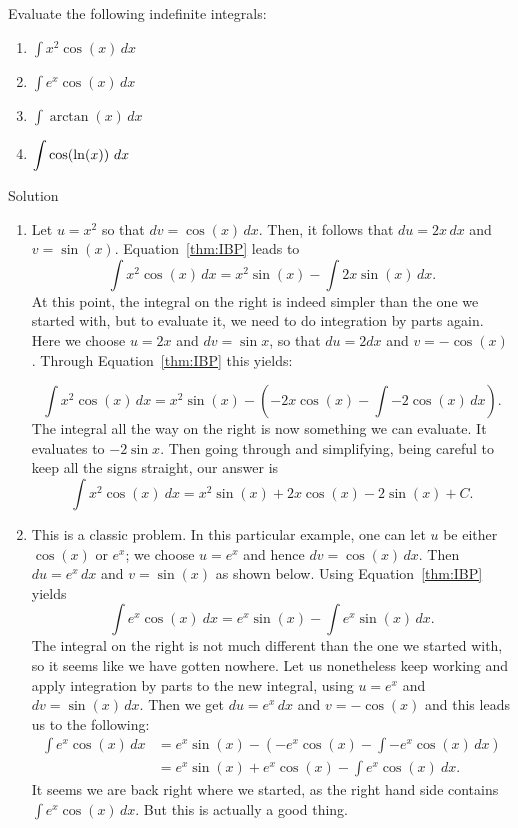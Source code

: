 \begin{example}
Evaluate the following indefinite integrals:
\begin{multicols}{2}
\begin{enumerate}
\item $\displaystyle \int x^2\cos(x) \,dx$
\item  $\displaystyle \int e^x\cos(x) \,dx$
\item $\displaystyle \int \arctan(x)  \,dx$
\item $\ds \int \cos(\ln(x))\ dx$
\end{enumerate}
\end{multicols}

\pagebreak
{}Solution 

\begin{enumerate}
\item  Let $u=x^2$ so that $dv=\cos(x)\,dx$.  Then, it follows that $du=2x\,dx$ and $v=\sin(x)$. Equation~\eqref{thm:IBP} leads to 
$$\int x^2\cos(x)\,dx = x^2\sin(x) - \int 2x\sin(x)\,dx.$$
At this point, the integral on the right is indeed simpler than the one we started with, but to evaluate it, we need to do integration by parts again. Here we choose $u=2x$ and $dv=\sin x$, so that $du=2dx$ and $v=-\cos(x)$. Through Equation~\eqref{thm:IBP} this yields:

$$\int x^2\cos(x)\,dx = x^2\sin(x) - \left(-2x\cos(x) - \int -2\cos(x)\,dx\right).$$
The integral all the way on the right is now something we can evaluate.  It evaluates to $-2\sin{x}$.  Then going through and simplifying, being careful to keep all the signs straight, our answer is
$$\int x^2\cos(x)\ dx = x^2\sin(x)  + 2x\cos(x) - 2\sin(x) + C.$$
\item This is a classic problem.  In this particular example, one can let $u$ be either $\cos(x)$ or $e^x$; we choose $u=e^x$ and hence $dv = \cos(x)\,dx$.  Then $du=e^x\,dx$ and $v=\sin(x)$ as shown below. Using Equation~\eqref{thm:IBP} yields
$$\int e^x\cos(x)\ dx = e^x\sin(x) - \int e^x\sin(x)\,dx.$$
The integral on the right is not much different than the one we started with, so it seems like we have gotten nowhere. Let us nonetheless  keep working and apply integration by parts to the new integral, using $u=e^x$ and $dv = \sin(x)\,dx$. Then we get $du=e^x\,dx$ and $v=-\cos(x)$ and this leads us to the following:
\begin{align*}
\int e^x\cos(x)\,dx &= e^x\sin(x) - \left(-e^x\cos(x) - \int -e^x\cos(x)\,dx\right)\\[0.2cm]
					&= e^x\sin(x)+ e^x\cos(x) - \int e^x\cos(x)\ dx.
\end{align*}
It seems we are back right where we started, as the right hand side contains $\int e^x\cos(x)\,dx$.  But this is actually a good thing.  


\end{enumerate}
\end{example}
